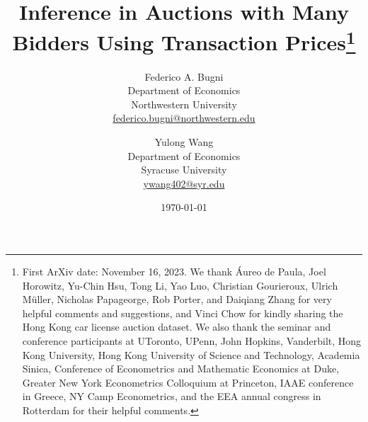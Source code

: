 \documentclass[11pt]{article}
\numberwithin{equation}{section}
\theoremstyle{definition}
\theoremstyle{remark}
\begin{document}
\sloppy
\title{Inference in Auctions with Many Bidders Using Transaction Prices\thanks{%
First ArXiv date: November 16, 2023. We thank 
\'Aureo de Paula, Joel Horowitz, Yu-Chin Hsu, Tong Li, Yao Luo, Christian Gourieroux, Ulrich M\"uller, Nicholas Papageorge, Rob Porter, and Daiqiang Zhang for very helpful comments and suggestions, and Vinci Chow for kindly sharing the Hong Kong car license auction dataset. We also thank the seminar and conference participants at UToronto, UPenn, John Hopkins, Vanderbilt, Hong Kong University, Hong Kong University of Science and Technology, Academia Sinica, Conference of Econometrics and Mathematic Economics at Duke, Greater New York Econometrics Colloquium at Princeton, IAAE conference in Greece, NY Camp Econometrics, and the EEA annual congress in Rotterdam for their helpful comments.}%
}
\author{Federico A. Bugni\\ Department of Economics\\ Northwestern University\\ \url{federico.bugni@northwestern.edu}
\and
Yulong Wang\\ Department of Economics\\ Syracuse University\\ \url{ywang402@syr.edu}}
\date{\today}
\maketitle
\end{document}
